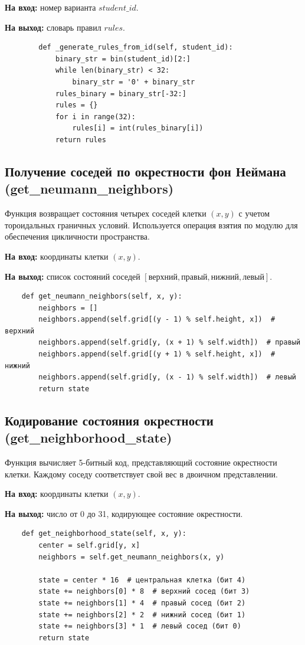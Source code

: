\documentclass[11pt,a4paper,final]{article}
\begin{document}
	\textbf{На вход:} номер варианта $student\_id$.  
	\par \textbf{На выход:} словарь правил $rules$.
	
	\begin{verbatim}
		def _generate_rules_from_id(self, student_id):
			binary_str = bin(student_id)[2:]
			while len(binary_str) < 32:
				binary_str = '0' + binary_str
			rules_binary = binary_str[-32:]
			rules = {}
			for i in range(32):
				rules[i] = int(rules_binary[i])
			return rules
	\end{verbatim}
	
	\subsection{Получение соседей по окрестности фон Неймана (get\_neumann\_neighbors)}
	
	Функция возвращает состояния четырех соседей клетки $(x, y)$ с учетом тороидальных граничных условий. Используется операция взятия по модулю для обеспечения цикличности пространства.
	
	\textbf{На вход:} координаты клетки $(x, y)$.  
	\par \textbf{На выход:} список состояний соседей $[верхний, правый, нижний, левый]$.
	
	\begin{verbatim}
	def get_neumann_neighbors(self, x, y):
        neighbors = []
		neighbors.append(self.grid[(y - 1) % self.height, x])  # верхний
		neighbors.append(self.grid[y, (x + 1) % self.width])  # правый
		neighbors.append(self.grid[(y + 1) % self.height, x])  # нижний
		neighbors.append(self.grid[y, (x - 1) % self.width])  # левый
		return state
	\end{verbatim}
	
	\subsection{Кодирование состояния окрестности (get\_neighborhood\_state)}
	
	Функция вычисляет 5-битный код, представляющий состояние окрестности клетки. Каждому соседу соответствует свой вес в двоичном представлении.
	
	\textbf{На вход:} координаты клетки $(x, y)$.  
	\par \textbf{На выход:} число от 0 до 31, кодирующее состояние окрестности.
	
	\begin{verbatim}
	def get_neighborhood_state(self, x, y):
        center = self.grid[y, x]
		neighbors = self.get_neumann_neighbors(x, y)
		
		state = center * 16  # центральная клетка (бит 4)
		state += neighbors[0] * 8  # верхний сосед (бит 3)
		state += neighbors[1] * 4  # правый сосед (бит 2)
		state += neighbors[2] * 2  # нижний сосед (бит 1)
		state += neighbors[3] * 1  # левый сосед (бит 0)
		return state
	\end{verbatim}
	
\end{document}
